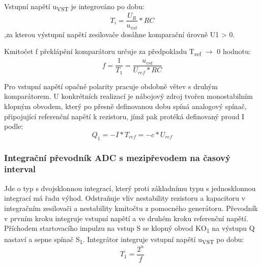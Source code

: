 Vstupní napětí u\textsubscript{VST} je integrováno po dobu:
\begin{equation}
T_{i}=\frac{U_{R}}{u_{vst}}*RC
\end{equation}
,za kterou výstupní napětí zesilovače dosáhne komparační úrovně U1 > 0.

Kmitočet f překlápění komparátoru určuje za předpokladu T\textsubscript{ref} $\rightarrow$ 0 hodnotu:
\begin{equation}
f=\frac{1}{T_{1}}=\frac{u_{vst}}{U_{ref}*RC}
\end{equation}

Pro vstupní napětí opačné polarity pracuje obdobně větev s druhým komparátorem. U konkrétních realizací je nábojový zdroj tvořen monostabilním klopným obvodem, který po přesně definovanou dobu spíná analogový spínač, připojující referenční napětí k rezistoru, jímž pak protéká definovaný proud I podle:
\begin{equation}
Q_{1}=-I*T_{ref}=-c*U_{ref}
\end{equation}

\subsubsection{Integrační převodník ADC s mezipřevodem na časový interval}
Jde o typ s dvojsklonnou integrací, který proti základnímu typu s jednosklonnou integrací má řadu výhod. Odstraňuje vliv nestability rezistoru a kapacitoru v integračním zesilovači a nestability kmitočtu z pomocného generátoru. Převodník v prvním
kroku integruje vstupní napětí a ve druhém kroku referenční napětí. Příchodem startovacího impulzu na vstup S se klopný obvod KO\textsubscript{1} na výstupu Q nastaví a sepne spínač S\textsubscript{1}. Integrátor integruje vstupní napětí u\textsubscript{VST} po dobu:
\begin{equation}
T_{1}=\frac{2^n}{f}
\end{equation}

